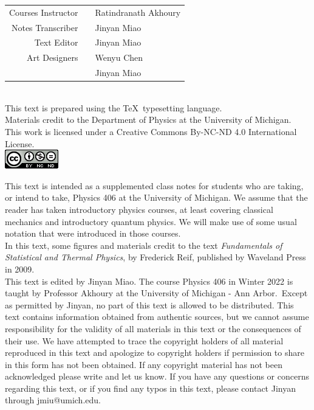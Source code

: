 \documentclass[11pt,oneside]{book}
\theoremstyle{break}
\theoremstyle{break}
\begin{document}
\begin{center}
\begin{tabular}{rcl}
Courses Instructor & & Ratindranath Akhoury \medskip
\\
Notes Transcriber & & Jinyan Miao\medskip
\\
Text Editor & & Jinyan Miao \medskip
\\
Art Designers & & Wenyu Chen \\
 & & Jinyan Miao \bigskip
\end{tabular} \\
This text is prepared using the \TeX\ typesetting language. \\
Materials credit to the Department of Physics at the University of Michigan.\\
This work is licensed under a Creative Commons By-NC-ND 4.0 International License.  \\
\medskip
\includegraphics[scale=0.8]{cclisence.png}
\end{center}
\hfill\break

This text is intended as a supplemented class notes for students who are taking, or intend to take, Physics 406 at the University of Michigan. We assume that the reader has taken introductory physics courses, at least covering classical mechanics and introductory quantum physics. We will make use of some usual notation that were introduced in those courses.\\

In this text, some figures and materials credit to the text \textit{Fundamentals of Statistical and Thermal Physics}, by Frederick Reif, published by Waveland Press in 2009.\\

This text is edited by Jinyan Miao. The course Physics 406 in Winter 2022 is taught by Professor Akhoury at the University of Michigan - Ann Arbor.\ Except as permitted by Jinyan, no part of this text is allowed to be distributed. This text contains information obtained from authentic sources, but we cannot assume responsibility for the validity of all materials in this text or the consequences of their use. We have attempted to trace the copyright holders of all material reproduced in this text and apologize to copyright holders if permission to share in this form has not been obtained. If any copyright material has not been acknowledged please write and let us know. If you have any questions or concerns regarding this text, or if you find any typos in this text, please contact Jinyan through jmiu@umich.edu. 
\end{document}
